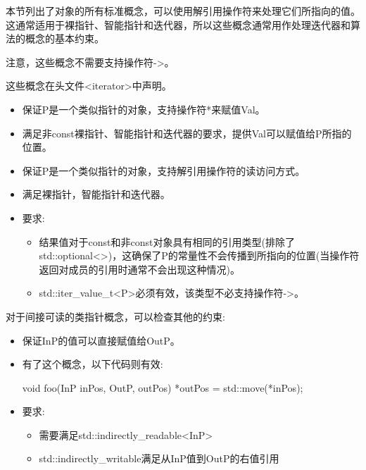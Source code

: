 
本节列出了对象的所有标准概念，可以使用解引用操作符来处理它们所指向的值。这通常适用于裸指针、智能指针和迭代器，所以这些概念通常用作处理迭代器和算法的概念的基本约束。

注意，这些概念不需要支持操作符->。

这些概念在头文件<iterator>中声明。



\begin{itemize}
\item
保证P是一个类似指针的对象，支持操作符*来赋值Val。
	
\item
满足非const裸指针、智能指针和迭代器的要求，提供Val可以赋值给P所指的位置。
\end{itemize}



\begin{itemize}
\item
保证P是一个类似指针的对象，支持解引用操作符的读访问方式。

\item
满足裸指针，智能指针和迭代器。


\item
要求:
\begin{itemize}
\item
结果值对于const和非const对象具有相同的引用类型(排除了std::optional<>)，这确保了P的常量性不会传播到所指向的位置(当操作符返回对成员的引用时通常不会出现这种情况)。

\item
std::iter\_value\_t<P>必须有效，该类型不必支持操作符->。
\end{itemize}
\end{itemize}


对于间接可读的类指针概念，可以检查其他的约束:


\begin{itemize}
\item
保证InP的值可以直接赋值给OutP。

\item
有了这个概念，以下代码则有效:

\begin{cpp}
void foo(InP inPos, OutP, outPos) {
	*outPos = std::move(*inPos);
}
\end{cpp}

\item
要求:
\begin{itemize}
\item
需要满足std::indirectly\_readable<InP>

\item
std::indirectly\_writable满足从InP值到OutP的右值引用
\end{itemize}
\end{itemize}

